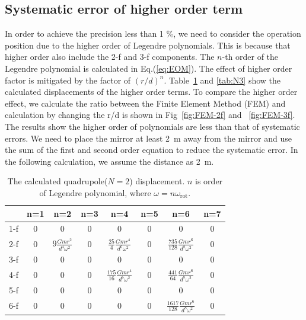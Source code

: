 \documentclass[%
 reprint,
superscriptaddress,
 amsmath,amssymb,
 aps,
]{revtex4-1}
\begin{document}
\subsection{Systematic error of higher order term}
In order to achieve the precision less than 1 \%, we need to consider the operation position due to the higher order of Legendre polynomials. This is because that higher order also include the 2-f and 3-f components. The $n$-th order of the Legendre polynomial is calculated in Eq.(\ref{eq:EOM}). The effect of higher order factor is mitigated by the factor of $(r/d)^n$. Table~\ref{tab:N2} and \ref{tab:N3} show the calculated displacements of the higher order terms. To compare the higher order effect, we calculate the ratio between the Finite Element Method (FEM) and calculation by changing the r/d is shown in Fig~\ref{fig:FEM-2f} and ~\ref{fig:FEM-3f}. The results show the higher order of polynomials are less than that of systematic errors. We need to place the mirror at least 2~m away from the mirror and use the sum of the first and second order equation to reduce the systematic error. In the following calculation, we assume the distance as 2~m. 

\begin{table}
\begin{center}
\caption{The calculated quadrupole($N=2$) displacement. $n$ is order of Legendre polynomial, where $\omega=n\omega_{\mathrm{rot}}$. \label{tab:N2}}
\footnotesize
\begin{tabular}{cccccccc}
\hline
& n=1 & n=2& n=3 &n=4&n=5&n=6&n=7 \\
\hline
1-f&0&0&0&0&0&0&0 \\
2-f&0&$9 \frac{Gmr^2}{d^4\omega^2}$&0&$\frac{25}{4} \frac{Gmr^4}{d^6\omega^2}$&0&$\frac{735}{128} \frac{Gmr^6}{d^8\omega^2}$&0  \\
3-f&0&0&0&0&0&0&0\\
4-f&0&0&0&$\frac{175}{16} \frac{Gmr^4}{d^6\omega^2}$&0& $\frac{441}{64} \frac{Gmr^6}{d^8\omega^2}$&0 \\
5-f&0&0&0&0&0&0&0 \\
6-f&0&0&0&0&0&$\frac{1617}{128} \frac{Gmr^6}{d^8\omega^2}$&0  \\
\hline
\end{tabular}
\end{center}
\end{table}
\end{document}
